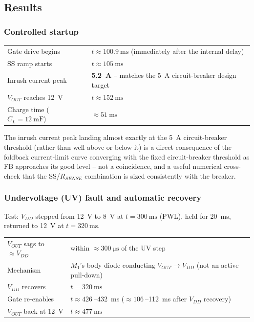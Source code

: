 \documentclass[11pt,letterpaper]{article}
\begin{document}
\subsection{Results}
\label{sec:results}

\subsubsection{Controlled startup}

\begin{center}
\begin{tabular}{@{}ll@{}}
\toprule
Gate drive begins & $t\approx\SI{100.9}{\milli\second}$ (immediately after the internal delay) \\
SS ramp starts & $t\approx\SI{105}{\milli\second}$ \\
Inrush current peak & \textbf{\SI{5.2}{\ampere}} -- matches the \SI{5}{\ampere} circuit-breaker design target \\
$V_{OUT}$ reaches \SI{12}{\volt} & $t\approx\SI{152}{\milli\second}$ \\
Charge time ($C_L=\SI{12}{\milli\farad}$) & $\approx\SI{51}{\milli\second}$ \\
\bottomrule
\end{tabular}
\end{center}

The inrush current peak landing almost exactly at the \SI{5}{\ampere} circuit-breaker threshold (rather
than well above or below it) is a direct consequence of the foldback current-limit curve converging with
the fixed circuit-breaker threshold as FB approaches its good level -- not a coincidence, and a useful
numerical cross-check that the SS/$R_{SENSE}$ combination is sized consistently with the breaker.

\subsubsection{Undervoltage (UV) fault and automatic recovery}

Test: $V_{DD}$ stepped from \SI{12}{\volt} to \SI{8}{\volt} at $t=\SI{300}{\milli\second}$ (PWL), held for
\SI{20}{\milli\second}, returned to \SI{12}{\volt} at $t=\SI{320}{\milli\second}$.

\begin{center}
\begin{tabular}{@{}ll@{}}
\toprule
$V_{OUT}$ sags to $\approx V_{DD}$ & within $\approx\SI{300}{\micro\second}$ of the UV step \\
Mechanism & $M_1$'s body diode conducting $V_{OUT}\rightarrow V_{DD}$ (not an active pull-down) \\
$V_{DD}$ recovers & $t=\SI{320}{\milli\second}$ \\
Gate re-enables & $t\approx\SI{426}{}$--\SI{432}{\milli\second} ($\approx\SI{106}{}$--\SI{112}{\milli\second} after $V_{DD}$ recovery) \\
$V_{OUT}$ back at \SI{12}{\volt} & $t\approx\SI{477}{\milli\second}$ \\
\bottomrule
\end{tabular}
\end{center}
\end{document}
